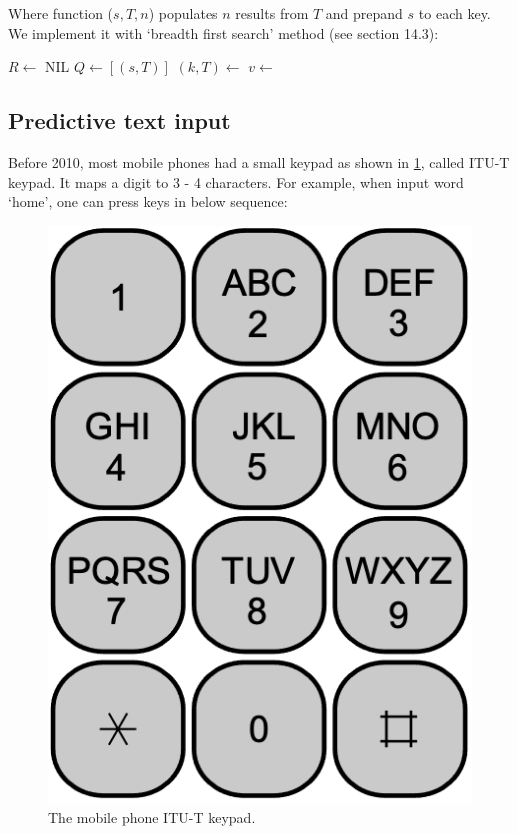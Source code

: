\documentclass[b5paper]{article}
\begin{document}
Where function ($s, T, n$) populates $n$ results from $T$ and prepand $s$ to each key. We implement it with `breadth first search' method (see section 14.3):

\begin{algorithmic}[1]
  \State $R \gets $ NIL
  \State $Q \gets [(s, T)]$
    \State $(k, T) \gets$ 
    \State $v \gets$ 
      \State {}
    \EndIf
      \State {}
    \EndFor
  \EndWhile
\EndFunction
\end{algorithmic}

\subsection{Predictive text input}

Before 2010, most mobile phones had a small keypad as shown in \cref{fig:itut-keypad}, called ITU-T keypad. It maps a digit to 3 - 4 characters. For example, when input word `home', one can press keys in below sequence:

\begin{figure}[htbp]
  \centering
  \includegraphics[scale=0.4]{img/itu-t}
  \caption{The mobile phone ITU-T keypad.}
  \label{fig:itut-keypad}
\end{figure}
\end{document}
